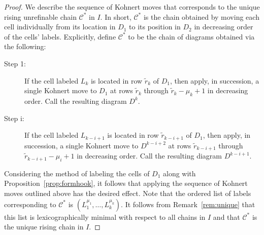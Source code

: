 \documentclass[letterpaper,10pt]{article}
\newcommand{\rn}[1]{{\color{red} #1}}
\newcommand{\bl}[1]{{\color{blue} #1}}
\newcommand{\precdot}{\prec\mathrel{\mkern-5mu}\mathrel{\cdot}}
\begin{document}
\begin{proof}
We describe the sequence of Kohnert moves that corresponds to the unique rising unrefinable chain $\mathcal{C}^*$ in $I.$ In short, $\mathcal{C}^*$ is the chain obtained by moving each cell individually from its location in $D_1$ to its position in $D_2$ in decreasing order of the cells' labels. Explicitly, define $\mathcal{C}^*$ to be the chain of diagrams obtained via the following:
\begin{description}
\item[Step 1:] If the cell labeled $L_k$ is located in row $\tilde{r}_k$ of $D_1$, then apply, in succession, a single Kohnert move to $D_1$ at rows $\tilde{r}_k$ through $\tilde{r}_k-\mu_k+1$ in decreasing order. Call the resulting diagram $D^k.$
\item[Step i:] If the cell labeled $L_{k-i+1}$ is located in row $\tilde{r}_{k-i+1}$ of $D_1$, then apply, in succession, a single Kohnert move to $D^{k-i+2}$ at rows $\tilde{r}_{k-i+1}$ through $\tilde{r}_{k-i+1}-\mu_i+1$ in decreasing order. Call the resulting diagram $D^{k-i+1}.$
\end{description}
\noindent Considering the method of labeling the cells of $D_1$ along with Proposition~\ref{prop:formhook}, it follows that applying the sequence of Kohnert moves outlined above has the desired effect. Note that the ordered list of labels corresponding to $\mathcal{C}^*$ is $(L_1^{\mu_1},\dots,L_k^{\mu_k}).$ It follows from Remark~\ref{rem:unique} that this list is lexicographically minimal with respect to all chains in $I$ and that $\mathcal{C}^*$ is the unique rising chain in $I.$
\end{proof}
\end{document}
